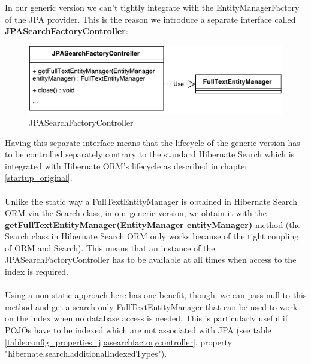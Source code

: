 In our generic version we can't tightly integrate with the EntityManagerFactory of the JPA provider. This is the reason we introduce a separate interface called \textbf{JPASearchFactoryController}:
\\
\begin{figure}[ht]
	\centering
	\includegraphics[scale=0.6]{images/JPASearchFactoryController.pdf}
	\caption{JPASearchFactoryController}
	\label{jpa_searchfactory_controller}
\end{figure}

\noindent
Having this separate interface means that the lifecycle of the generic version has to be controlled separately contrary to the standard Hibernate Search which is integrated with Hibernate ORM's lifecycle as described in chapter \ref{startup_original}.
\\\\
Unlike the static way a FullTextEntityManager is obtained in Hibernate Search ORM via the Search class, in our generic version, we obtain it with the \textbf{getFullTextEntityManager(EntityManager entityManager)} method (the Search class in Hibernate Search ORM only works because of the tight coupling of ORM and Search). This means that an instance of the JPASearchFactoryController has to be available at all times when access to the index is required.
\\\\
Using a non-static approach here has one benefit, though: we can pass null to this method and get a search only FullTextEntityManager that can be used to work on the index when no database access is needed. This is particularly useful if POJOs have to be indexed which are not associated with JPA (see table \ref{table:config_properties_jpasearchfactorycontroller}, property "hibernate.search.additionalIndexedTypes").

\pagebreak

